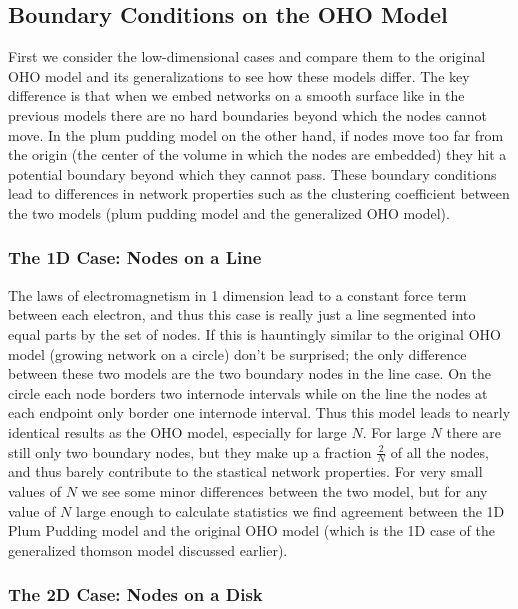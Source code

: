 \documentclass[aps,pre,reprint,superscriptaddress,amsmath,amssymb]{revtex4-1}
\begin{document}


\subsection{Boundary Conditions on the OHO Model}
First we consider the low-dimensional cases and compare them to the original OHO model and its generalizations to see how these models differ.
The key difference is that when we embed networks on a smooth surface like in the previous models there are no hard boundaries beyond which the nodes cannot move.
In the plum pudding model on the other hand, if nodes move too far from the origin (the center of the volume in which the nodes are embedded) they hit a potential boundary beyond which they cannot pass.
These boundary conditions lead to differences in network properties such as the clustering coefficient between the two models (plum pudding model and the generalized OHO model).

\subsubsection{The 1D Case: Nodes on a Line}
The laws of electromagnetism in 1 dimension lead to a constant force term between each electron, and thus this case is really just a line segmented into equal parts by the set of nodes. 
If this is hauntingly similar to the original OHO model (growing network on a circle)  don't be surprised; the only difference between these two models are the two boundary nodes in the line case. 
On the circle each node borders two internode intervals while on the line the nodes at each endpoint only border one internode interval.
Thus this model leads to nearly identical results as the OHO model, especially for large $N$.
For large $N$ there are still only two boundary nodes, but they make up a fraction $\frac{2}{N}$ of all the nodes, and thus barely contribute to the stastical network properties.
For very small values of $N$ we see some minor differences between the two model, but for any value of $N$ large enough to calculate statistics we find agreement between the 1D Plum Pudding model and the original OHO model (which is the 1D case of the generalized thomson model discussed earlier).



\subsubsection{The 2D Case: Nodes on a Disk}
\end{document}
